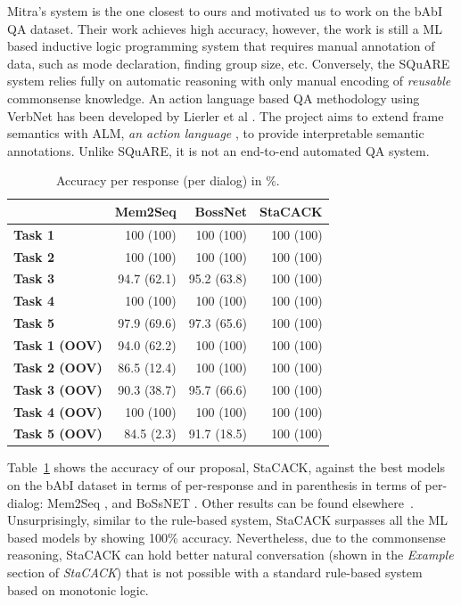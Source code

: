 \documentclass[letterpaper]{article}
\begin{document}
Mitra's system is the one closest to ours and motivated us to work on
the bAbI QA dataset. Their work achieves high accuracy, however, the
work is still a ML based inductive logic programming system that
requires manual annotation of data, such as mode declaration, finding
group size, etc. Conversely, the SQuARE system relies fully on
automatic reasoning with only manual encoding of \textit{reusable}
commonsense knowledge. An action language based QA methodology using
VerbNet has been developed by Lierler et al \cite{ALM}. The project
aims to extend frame semantics with ALM, \textit{an action language}
\cite{ALM}, to provide interpretable semantic annotations. Unlike
SQuARE, it is not an end-to-end automated QA system.

\begin{table}
\centering
\scriptsize
\setlength{\tabcolsep}{0.72em}
\begin{tabular}{|l|*{3}{r|}}
\hline
    &  \textbf{Mem2Seq}
      & \textbf{BossNet}
    & \textbf{StaCACK}
  \\[.82em]
  \hline\hline
\textbf{Task 1}  & 100 (100) & 100 (100)  & 100 (100) \\\hline
\textbf{Task 2}  & 100 (100) & 100 (100)  & 100 (100) \\\hline
\textbf{Task 3}  & 94.7 (62.1) & 95.2 (63.8)  & 100 (100) \\\hline
\textbf{Task 4}  & 100 (100) & 100 (100)  & 100 (100) \\\hline
\textbf{Task 5}  & 97.9 (69.6) & 97.3 (65.6)  & 100 (100) \\\hline
\textbf{Task 1 (OOV)} & 94.0 (62.2) & 100 (100)   & 100 (100)\\\hline
\textbf{Task 2 (OOV)} & 86.5 (12.4)  & 100 (100) & 100 (100) \\\hline
\textbf{Task 3 (OOV)} & 90.3 (38.7) & 95.7 (66.6)  & 100 (100) \\\hline
\textbf{Task 4 (OOV)} & 100 (100) & 100 (100) & 100 (100) \\\hline
\textbf{Task 5 (OOV)} & 84.5 (2.3) & 91.7 (18.5)  & 100 (100) \\\hline

\end{tabular}

\caption{Accuracy per response (per dialog) in \%.}
\label{table:Stacack_compare}
\vspace{-1em}
\end{table}


Table~\ref{table:Stacack_compare} shows the accuracy of our proposal,
StaCACK, against the best models on the bAbI dataset in terms of
per-response and in parenthesis in terms of per-dialog: Mem2Seq
\cite{mem2seq}, and BoSsNET \cite{bossnet}. Other results can be found
elsewhere~\cite{babi_dialog}.
%
Unsurprisingly, similar to the rule-based system, StaCACK surpasses
all the ML based models by showing 100\% accuracy. Nevertheless, due
to the commonsense reasoning, StaCACK can hold better natural
conversation (shown in the \textit{Example} section of
\textit{StaCACK}) that is not possible with a standard rule-based
system based on monotonic logic.
\end{document}
